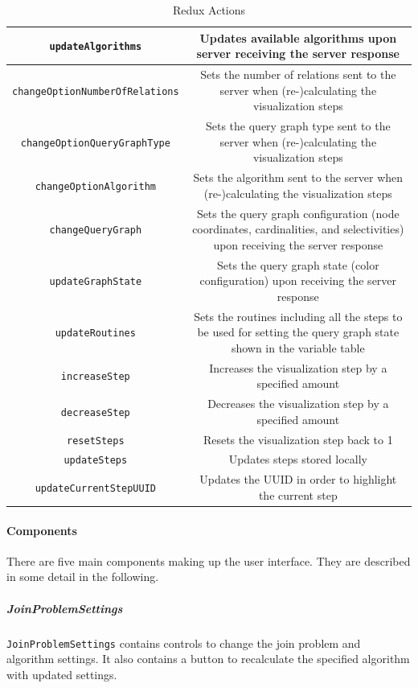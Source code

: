 \begin{table}[H]
\setlength\extrarowheight{2pt}
\begin{tabularx}{\textwidth + 2cm}{|C|C|}
\hline
\texttt{updateAlgorithms} & Updates available algorithms upon server receiving the server response\\\hline
\texttt{changeOptionNumberOfRelations} & Sets the number of relations sent to the server when (re-)calculating the visualization steps\\\hline
\texttt{changeOptionQueryGraphType} & Sets the query graph type sent to the server when (re-)calculating the visualization steps\\\hline
\texttt{changeOptionAlgorithm} & Sets the algorithm sent to the server when (re-)calculating the visualization steps\\\hline
\texttt{changeQueryGraph} & Sets the query graph configuration (node coordinates, cardinalities, and selectivities) upon receiving the server response\\\hline
\texttt{updateGraphState} & Sets the query graph state (color configuration) upon receiving the server response\\\hline
\texttt{updateRoutines} & Sets the routines including all the steps to be used for setting the query graph state shown in the variable table\\\hline
\texttt{increaseStep} & Increases the visualization step by a specified amount\\\hline
\texttt{decreaseStep} & Decreases the visualization step by a specified amount\\\hline
\texttt{resetSteps} & Resets the visualization step back to 1\\\hline
\texttt{updateSteps} & Updates steps stored locally\\\hline
\texttt{updateCurrentStepUUID} & Updates the UUID in order to highlight the current step\\\hline
\end{tabularx}
\caption{Redux Actions}
\end{table}

\paragraph{Components}
There are five main components making up the user interface. They are described in some detail in the following.

\subparagraph{JoinProblemSettings}
\texttt{JoinProblemSettings} contains controls to change the join problem and algorithm settings. It also contains a button to recalculate the specified algorithm with updated settings.

